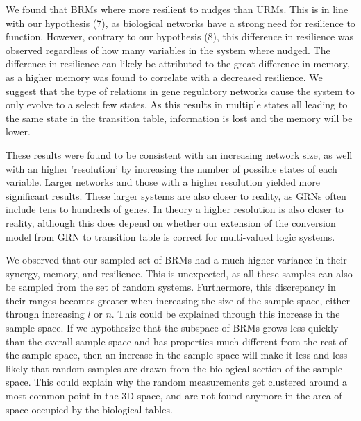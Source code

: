 \documentclass[../main.tex]{subfiles}
\begin{document}
We found that BRMs where more resilient to nudges than URMs.
This is in line with our hypothesis (7), as biological networks have a strong need for resilience to function.
However, contrary to our hypothesis (8), this difference in resilience was observed regardless of how many variables in the system where nudged.
The difference in resilience can likely be attributed to the great difference in memory, as a higher memory was found to correlate with a decreased resilience.
We suggest that the type of relations in gene regulatory networks cause the system to only evolve to a select few states.
As this results in multiple states all leading to the same state in the transition table, information is lost and the memory will be lower.

These results were found to be consistent with an increasing network size, as well with an higher 'resolution' by increasing the number of possible states of each variable.
Larger networks and those with a higher resolution yielded more significant results.
These larger systems are also closer to reality, as GRNs often include tens to hundreds of genes.
In theory a higher resolution is also closer to reality, although this does depend on whether our extension of the conversion model from GRN to transition table is correct for multi-valued logic systems.

We observed that our sampled set of BRMs had a much higher variance in their synergy, memory, and resilience.
This is unexpected, as all these samples can also be sampled from the set of random systems.
Furthermore, this discrepancy in their ranges becomes greater when increasing the size of the sample space, either through increasing $l$ or $n$.
This could be explained through this increase in the sample space.
If we hypothesize that the subspace of BRMs grows less quickly than the overall sample space and has properties much different from the rest of the sample space, then an increase in the sample space will make it less and less likely that random samples are drawn from the biological section of the sample space.
This could explain why the random measurements get clustered around a most common point in the 3D space, and are not found anymore in the area of space occupied by the biological tables.
\end{document}
